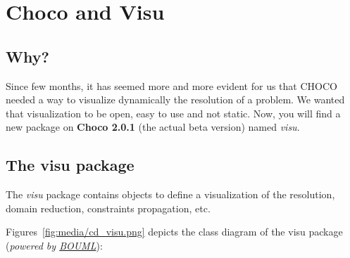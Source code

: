 \label{chocoandvisu}
\hypertarget{chocoandvisu}{}

\chapter{Choco and Visu}\label{chocoandvisu:chocoandvisu}\hypertarget{chocoandvisu:chocoandvisu}{}

\section{Why?}\label{chocoandvisu:why}\hypertarget{chocoandvisu:why}{}
Since few months, it has seemed more and more evident for us that CHOCO needed a way to visualize dynamically the resolution of a problem.
We wanted that visualization to be open, easy to use and not static.
Now, you will find a new package on \textbf{Choco 2.0.1} (the actual beta version) named \emph{visu}.

\section{The visu package}\label{chocoandvisu:thevisupackage}\hypertarget{chocoandvisu:thevisupackage}{}

The \emph{visu} package contains objects to define a visualization of the resolution, domain reduction, constraints propagation, etc. %


Figures~\ref{fig:media/cd_visu.png} depicts the class diagram of the visu package (\emph{powered by \href{http://bouml.free.fr/}{BOUML}}):

